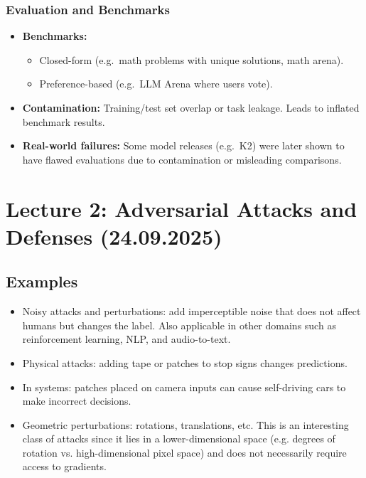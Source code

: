 \documentclass[11pt]{article}
\begin{document}
\subsubsection{Evaluation and Benchmarks}
\begin{itemize}
	\item \textbf{Benchmarks:}
	      \begin{itemize}
		      \item Closed-form (e.g.\ math problems with unique solutions, math arena).
		      \item Preference-based (e.g.\ LLM Arena where users vote).
	      \end{itemize}
	\item \textbf{Contamination:} Training/test set overlap or task leakage.  
	      Leads to inflated benchmark results.
	\item \textbf{Real-world failures:} Some model releases (e.g.\ K2) were later shown to have flawed evaluations due to contamination or misleading comparisons.
\end{itemize}
\newpage

\section{Lecture 2: Adversarial Attacks and Defenses (24.09.2025)} %
\subsection{Examples}
\begin{itemize}
	\item Noisy attacks and perturbations: add imperceptible noise that does not affect humans but changes the label. Also applicable in other domains such as reinforcement learning, NLP, and audio-to-text.
	\item Physical attacks: adding tape or patches to stop signs changes predictions.
	\item In systems: patches placed on camera inputs can cause self-driving cars to make incorrect decisions.
	\item Geometric perturbations: rotations, translations, etc. This is an interesting class of attacks since it lies in a lower-dimensional space (e.g. degrees of rotation vs. high-dimensional pixel space) and does not necessarily require access to gradients.
\end{itemize}
\end{document}

